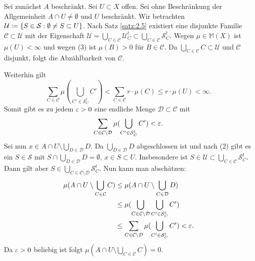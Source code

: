 \documentclass[a4paper,twoside,DIV15,BCOR12mm]{scrbook}
\begin{document}
\begin{beweis}
Sei zunächst $A$ beschränkt. Sei $U\subset X$ offen. Sei ohne Beschränkung der Allgemeinheit $A\cap U\ne \emptyset$ und $U$ beschränkt. Wir betrachten $\mathcal U \da \{S\in\mathcal S: \emptyset \ne S\subset U\}$. Nach Satz \ref{satz:2.5} existiert eine disjunkte Familie $\mathcal C\subset \mathcal U$ mit der Eigenschaft $\mathcal U = \bigcup_{C\in\mathcal C} \mathcal U_C^t \subset \bigcup_{C\in\mathcal C}\mathcal S_C^t$. Wegen $\mu\in\mathbb M(X)$ ist $\mu(U)<\infty$ und wegen (3) ist $\mu(B) >0$ für $B\in\mathcal C$. Da $\bigcup_{C\in\mathcal C} C \subset \mathcal U$ und $\mathcal C$ disjunkt, folgt die Abzählbarkeit von $\mathcal C$.

Weiterhin gilt
\[
\sum_{C\in\mathcal C} \mu(\bigcup_{C'\in\mathcal S_C^t} C') < \sum_{C\in\mathcal C} r\cdot \mu(C) \le r\cdot \mu(U) <\infty.
\]
Somit gibt es zu jedem $\varepsilon>0$ eine endliche Menge $\mathcal D \subset \mathcal C$ mit
\[
\sum_{C\in\mathcal C\setminus\mathcal D} \mu(\bigcup_{C'\in\mathcal S_C^t} C') < \varepsilon.
\]
Sei nun $x\in A\cap U \setminus \bigcup_{D\in\mathcal D} D$. Da $\bigcup_{D\in\mathcal D}D$ abgeschlossen ist und nach (2) gibt es ein $S\in\mathcal S$ mit $S\cap \bigcup_{D\in\mathcal D}D =\emptyset$, $x\in S\subset U$. Insbesondere ist $S\in \mathcal U \subset \bigcup_{C\in\mathcal C}\mathcal S_C^t$. Dann gilt aber $S\in \bigcup_{C\in\mathcal C\setminus\mathcal D} \mathcal S_C^t$. Nun kann man abschätzen:
\begin{align*}
\mu(A\cap U\setminus \bigcup_{C\in\mathcal C}C)
&\le \mu(A\cap U \setminus\bigcup_{C\in\mathcal D} D) \\
&\le \mu(\bigcup_{C\in\mathcal C \setminus\mathcal D} \bigcup_{C'\in\mathcal S_C^t} C') \\
&\le \sum_{C\in\mathcal C\setminus\mathcal D} \mu(\bigcup_{C'\in\mathcal S_C^t} C') < \varepsilon .
\end{align*}
Da $\varepsilon>0$ beliebig ist folgt $\mu(A\cap U\setminus \bigcup_{C\in\mathcal C}C)=0$.


\end{beweis}
\end{document}
